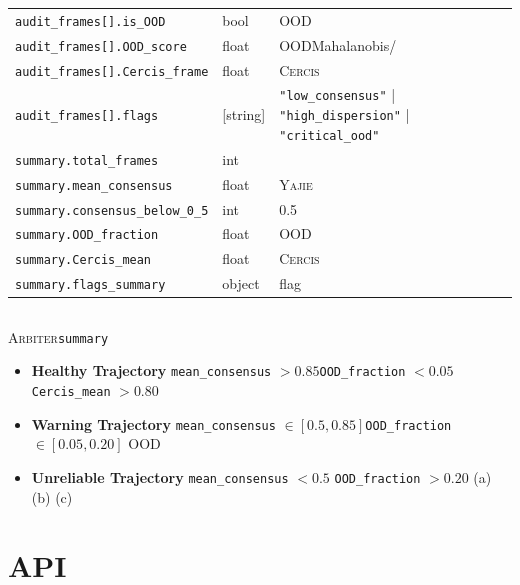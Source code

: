 \documentclass[12pt,a4paper]{article}
\theoremstyle{remark}
\newcommand{\Yajie}{\textsc{Yajie}}
\newcommand{\Cercis}{\textsc{Cercis}}
\newcommand{\Arbiter}{\textsc{Arbiter}}
\begin{document}
\begin{table}[H]
\begin{tabular}{@{}p{3.2cm} p{2.0cm} p{8.8cm}@{}}
\texttt{audit\_frames[].is\_OOD} & bool & OOD \\
\texttt{audit\_frames[].OOD\_score} & float & OODMahalanobis/ \\
\texttt{audit\_frames[].Cercis\_frame} & float & \Cercis{} \\
\texttt{audit\_frames[].flags} & [string] & \texttt{"low\_consensus"} | \texttt{"high\_dispersion"} | \texttt{"critical\_ood"} \\
\midrule
\texttt{summary.total\_frames} & int &  \\
\texttt{summary.mean\_consensus} & float & \Yajie{} \\
\texttt{summary.consensus\_below\_0\_5} & int & 0.5 \\
\texttt{summary.OOD\_fraction} & float & OOD \\
\texttt{summary.Cercis\_mean} & float & \Cercis{} \\
\texttt{summary.flags\_summary} & object & flag \\
\bottomrule
\end{tabular}
\end{table}

\subsection{}

\Arbiter{}\texttt{summary}

\begin{itemize}[itemsep=3pt]
    \item \textbf{Healthy Trajectory}
    \texttt{mean\_consensus} $> 0.85$\texttt{OOD\_fraction} $< 0.05$
    \texttt{Cercis\_mean} $> 0.80$

    \item \textbf{Warning Trajectory}
    \texttt{mean\_consensus} $\in [0.5, 0.85]$\texttt{OOD\_fraction} $\in [0.05, 0.20]$
    OOD
    

    \item \textbf{Unreliable Trajectory}
    \texttt{mean\_consensus} $< 0.5$  \texttt{OOD\_fraction} $> 0.20$
    (a) (b) 
    (c) 
\end{itemize}

\newpage

\section{API}
\end{document}

